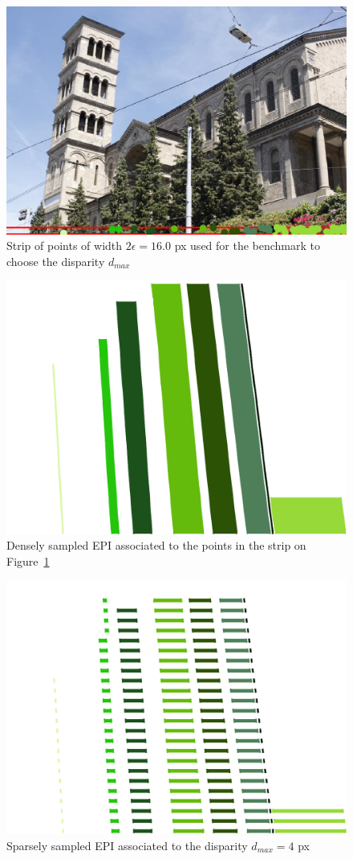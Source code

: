 \begin{itemize}
\bigskip

\begin{figure}[h!]
\centering
\includegraphics[width = 0.7 \textwidth]{./Diagrams/results/Disparity_benchmark/673_10_102_4_48_8_strip.png}
\caption{Strip of points of width $2\epsilon = 16.0$ px used for the benchmark to choose the disparity $d_{max}$}
\label{fig:strip_disparity}
\end{figure}

\begin{figure}[h!]
\centering
\includegraphics[width = 0.7 \textwidth]{./Diagrams/results/Disparity_benchmark/673_10_102_4_48_8_dense.png}
\caption{Densely sampled EPI associated to the points in the strip on Figure~\ref{fig:strip_disparity}}
\label{fig:dense_disparity}
\end{figure}

\begin{figure}[h!]
\centering
\includegraphics[width = 0.7 \textwidth]{./Diagrams/results/Disparity_benchmark/673_10_102_4_48_8_sparse.png}
\caption{Sparsely sampled EPI associated to the disparity $d_{max} = 4$ px}
\label{fig:first_sparse_disparity}
\end{figure}


\end{itemize}

